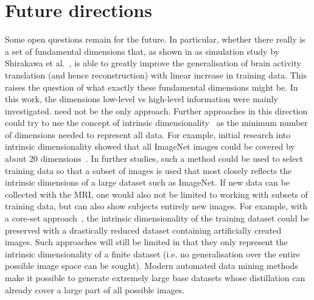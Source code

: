 \section{Future directions}

Some open questions remain for the future. In particular, whether there really is a set of fundamental dimensions that, as shown in as simulation study by Shirakawa et al.~\cite{shirakawaSpuriousReconstructionBrain2024}, is able to greatly improve the generalisation of brain activity translation (and hence reconstruction) with linear increase in training data. This raises the question of what exactly these fundamental dimensions might be. In this work, the dimensions low-level vs high-level information were mainly investigated.  need not be the only approach. Further approaches in this direction could try to use the concept of intrinsic dimensionality~\cite{bennettIntrinsicDimensionalitySignal1969} as the minimum number of dimensions needed to represent all data. For example, initial research into intrinsic dimensionality showed that all ImageNet images could be covered by about 20 dimensions~\cite{popeIntrinsicDimensionImages2021}. In further studies, such a method could be used to select training data so that a subset of images is used that most closely reflects the intrinsic dimensions of a large dataset such as ImageNet. If new data can be collected with the MRI, one would also not be limited to working with subsets of training data, but can also show subjects entirely new images. For example, with a core-set approach~\cite{nguyenDatasetDistillationInfinitely2021,wangDatasetDistillation2018}, the intrinsic dimensionality of the training dataset could be preserved with a drastically reduced dataset containing artificially created images. Such approaches will still be limited in that they only represent the intrinsic dimensionality of a finite dataset (i.e. no generalisation over the entire possible image space can be sought).  Modern automated data mining methods make it possible to generate extremely large base datasets whose distillation can already cover a large part of all possible images. 


